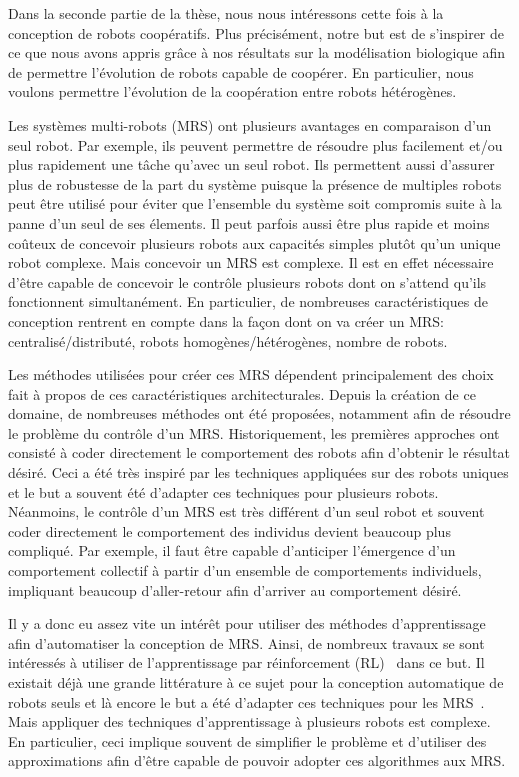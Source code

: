 		Dans la seconde partie de la thèse, nous nous intéressons cette fois à la conception de robots coopératifs. Plus précisément, notre but est de s'inspirer de ce que nous avons appris grâce à nos résultats sur la modélisation biologique afin de permettre l'évolution de robots capable de coopérer. En particulier, nous voulons permettre l'évolution de la coopération entre robots hétérogènes.

		Les systèmes multi-robots (MRS) ont plusieurs avantages en comparaison d'un seul robot. Par exemple, ils peuvent permettre de résoudre plus facilement et/ou plus rapidement une tâche qu'avec un seul robot. Ils permettent aussi d'assurer plus de robustesse de la part du système puisque la présence de multiples robots peut être utilisé pour éviter que l'ensemble du système soit compromis suite à la panne d'un seul de ses élements. Il peut parfois aussi être plus rapide et moins coûteux de concevoir plusieurs robots aux capacités simples plutôt qu'un unique robot complexe. Mais concevoir un MRS est complexe. Il est en effet nécessaire d'être capable de concevoir le contrôle plusieurs robots dont on s'attend qu'ils fonctionnent simultanément. En particulier, de nombreuses caractéristiques de conception rentrent en compte dans la façon dont on va créer un MRS: centralisé/distributé, robots homogènes/hétérogènes, nombre de robots. 

		Les méthodes utilisées pour créer ces MRS dépendent principalement des choix fait à propos de ces caractéristiques architecturales. Depuis la création de ce domaine, de nombreuses méthodes ont été proposées, notamment afin de résoudre le problème du contrôle d'un MRS. Historiquement, les premières approches ont consisté à coder directement le comportement des robots afin d'obtenir le résultat désiré. Ceci a été très inspiré par les techniques appliquées sur des robots uniques et le but a souvent été d'adapter ces techniques pour plusieurs robots. Néanmoins, le contrôle d'un MRS est très différent d'un seul robot et souvent coder directement le comportement des individus devient beaucoup plus compliqué. Par exemple, il faut être capable d'anticiper l'émergence d'un comportement collectif à partir d'un ensemble de comportements individuels, impliquant beaucoup d'aller-retour afin d'arriver au comportement désiré.

		Il y a donc eu assez vite un intérêt pour utiliser des méthodes d'apprentissage afin d'automatiser la conception de MRS. Ainsi, de nombreux travaux se sont intéressés à utiliser de l'apprentissage par réinforcement (RL)~\parencite{Sutton1998}  dans ce but. Il existait déjà une grande littérature à ce sujet pour la conception automatique de robots seuls et là encore le but a été d'adapter ces techniques pour les MRS~\parencite{Gultekin2002, Bowling2003, Fernandez2005}. Mais appliquer des techniques d'apprentissage à plusieurs robots est complexe. En particulier, ceci implique souvent de simplifier le problème et d'utiliser des approximations afin d'être capable de pouvoir adopter ces algorithmes aux MRS.

